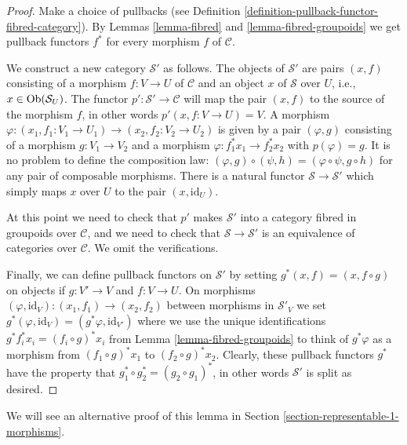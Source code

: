 \begin{proof}
Make a choice of pullbacks (see
Definition \ref{definition-pullback-functor-fibred-category}).
By Lemmas \ref{lemma-fibred} and \ref{lemma-fibred-groupoids}
we get pullback functors $f^*$ for
every morphism $f$ of $\mathcal{C}$.

\medskip\noindent
We construct a new category $\mathcal{S}'$ as follows.
The objects of $\mathcal{S}'$ are pairs $(x, f)$
consisting of a morphism $f : V \to U$ of $\mathcal{C}$
and an object $x$ of $\mathcal{S}$ over $U$, i.e.,
$x\in \mathop{\mathrm{Ob}}\nolimits(\mathcal{S}_U)$. The functor
$p' : \mathcal{S}' \to \mathcal{C}$ will map the pair $(x, f)$ to the source
of the morphism $f$, in other words $p'(x, f : V\to U) = V$. A morphism
$\varphi : (x_1, f_1: V_1 \to U_1) \to (x_2, f_2 : V_2 \to U_2)$ is given by a
pair $(\varphi, g)$ consisting of a morphism $g : V_1 \to V_2$ and a morphism
$\varphi : f_1^\ast x_1 \to f_2^\ast x_2$ with $p(\varphi) = g$. It is no
problem to define the composition law: $(\varphi, g) \circ (\psi, h) =
(\varphi \circ \psi, g\circ h)$ for any pair of composable morphisms.
There is a natural functor $\mathcal{S} \to \mathcal{S}'$ which simply maps
$x$ over $U$ to the pair $(x, \text{id}_U)$.

\medskip\noindent
At this point we need to check that $p'$ makes $\mathcal{S}'$ into a category
fibred in groupoids over $\mathcal{C}$, and we need to check that
$\mathcal{S} \to \mathcal{S}'$ is an equivalence of categories over
$\mathcal{C}$. We omit the verifications.

\medskip\noindent
Finally, we can define pullback functors on $\mathcal{S}'$
by setting $g^\ast(x, f) = (x, f \circ g)$ on objects if
$g : V' \to V$ and $f : V \to U$. On morphisms
$(\varphi, \text{id}_V) : (x_1, f_1) \to (x_2, f_2)$
between morphisms in $\mathcal{S}'_V$ we set $g^\ast(\varphi, \text{id}_V) =
(g^\ast\varphi, \text{id}_{V'})$ where we use the unique identifications
$g^\ast f_i^\ast x_i = (f_i \circ g)^\ast x_i$ from Lemma
\ref{lemma-fibred-groupoids} to think of $g^\ast\varphi$ as a morphism from
$(f_1 \circ g)^\ast x_1$ to $(f_2 \circ g)^\ast x_2$. Clearly, these pullback
functors $g^\ast$ have the property that
$g_1^\ast \circ g_2^\ast = (g_2\circ g_1)^\ast$, in other words $\mathcal{S}'$
is split as desired.
\end{proof}

\noindent
We will see an alternative proof of this lemma in
Section \ref{section-representable-1-morphisms}.









